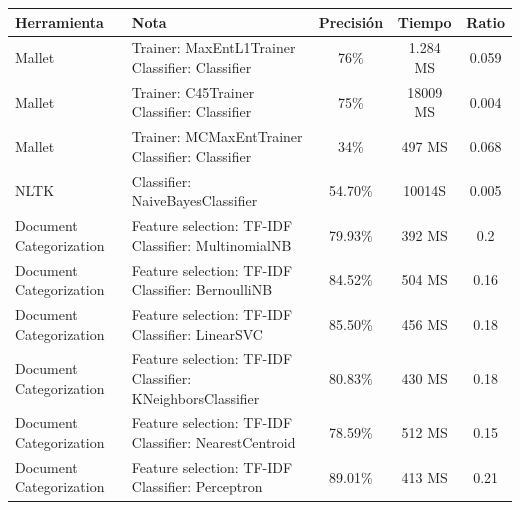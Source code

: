 \documentclass[runningheads,a4paper]{llncs}
\theoremstyle{break}
\newcommand{\rowstyle}[1]{\gdef\currentrowstyle{#1}%
  #1\ignorespaces
}
\begin{document}
\bgroup
\setlength{\tabcolsep}{10pt}
\def\arraystretch{1.8}
\begin{table}
\begin{tabular}{p{2.8cm}|p{4cm}|c|c|c}
 
\rowstyle{\bfseries} Herramienta & \rowstyle{\bfseries} Nota & \rowstyle{\bfseries} Precisión & \rowstyle{\bfseries} Tiempo & \rowstyle{\bfseries} Ratio\\ \hline

Mallet & Trainer: MaxEntL1Trainer \newline Classifier: Classifier                      & 76\%    & 1.284 MS & 0.059\\
Mallet & Trainer: C45Trainer \newline Classifier: Classifier                           & 75\%    & 18009 MS & 0.004 \\
Mallet & Trainer: MCMaxEntTrainer \newline Classifier: Classifier                   & 34\%    & 497 MS & 0.068\\
NLTK   & Classifier: NaiveBayesClassifier							   & 54.70\% & 10014S & 0.005 \\
Document \newline Categorization &  Feature selection: TF-IDF \newline Classifier: MultinomialNB 
& 79.93\% & 392 MS & 0.2 \\ 
Document \newline Categorization &  Feature selection: TF-IDF \newline Classifier: BernoulliNB 
& 84.52\% & 504 MS & 0.16 \\
Document \newline Categorization &  Feature selection: TF-IDF \newline Classifier: LinearSVC 
& 85.50\% &  456 MS & 0.18\\ 
Document \newline Categorization &  Feature selection: TF-IDF \newline Classifier: KNeighborsClassifier & 80.83\% &  430 MS & 0.18 \\ 
Document \newline Categorization &  Feature selection: TF-IDF \newline Classifier: NearestCentroid 
& 78.59\% &  512 MS & 0.15 \\ 
Document \newline Categorization &  Feature selection: TF-IDF \newline Classifier: Perceptron 
& 89.01\% &  413 MS & 0.21\\


\end{tabular}
\end{table}
\end{document}
